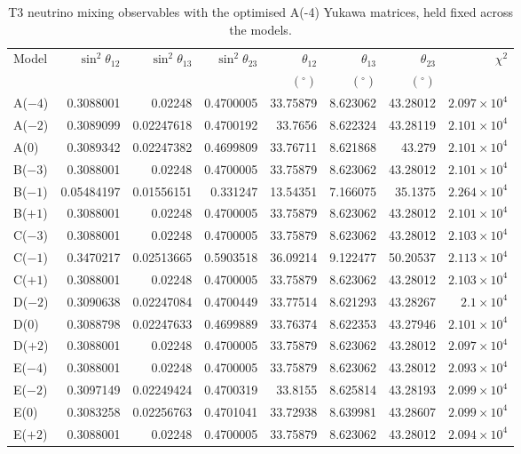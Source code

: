 \begin{table}[p]
\centering
\caption{T3 neutrino mixing observables with the optimised A(-4) Yukawa matrices, held fixed across the models.}
\label{tab:appC_Am4_mixing}
\begingroup
\footnotesize
\setlength{\tabcolsep}{3.2pt}
\begin{tabular}{lrrrrrrr}
\hline
Model & $\sin^2\theta_{12}$ & $\sin^2\theta_{13}$ & $\sin^2\theta_{23}$ & $\theta_{12}$ & $\theta_{13}$ & $\theta_{23}$ & $\chi^2$ \\
 &  &  &  & $(^\circ)$ & $(^\circ)$ & $(^\circ)$ &  \\
\hline
A($-4$) & 0.3088001 & 0.02248 & 0.4700005 & 33.75879 & 8.623062 & 43.28012 & $2.097\times10^{4}$ \\
A($-2$) & 0.3089099 & 0.02247618 & 0.4700192 & 33.7656 & 8.622324 & 43.28119 & $2.101\times10^{4}$ \\
A($0$) & 0.3089342 & 0.02247382 & 0.4699809 & 33.76711 & 8.621868 & 43.279 & $2.101\times10^{4}$ \\
B($-3$) & 0.3088001 & 0.02248 & 0.4700005 & 33.75879 & 8.623062 & 43.28012 & $2.101\times10^{4}$ \\
B($-1$) & 0.05484197 & 0.01556151 & 0.331247 & 13.54351 & 7.166075 & 35.1375 & $2.264\times10^{4}$ \\
B($+1$) & 0.3088001 & 0.02248 & 0.4700005 & 33.75879 & 8.623062 & 43.28012 & $2.101\times10^{4}$ \\
C($-3$) & 0.3088001 & 0.02248 & 0.4700005 & 33.75879 & 8.623062 & 43.28012 & $2.103\times10^{4}$ \\
C($-1$) & 0.3470217 & 0.02513665 & 0.5903518 & 36.09214 & 9.122477 & 50.20537 & $2.113\times10^{4}$ \\
C($+1$) & 0.3088001 & 0.02248 & 0.4700005 & 33.75879 & 8.623062 & 43.28012 & $2.103\times10^{4}$ \\
D($-2$) & 0.3090638 & 0.02247084 & 0.4700449 & 33.77514 & 8.621293 & 43.28267 & $2.1\times10^{4}$ \\
D($0$) & 0.3088798 & 0.02247633 & 0.4699889 & 33.76374 & 8.622353 & 43.27946 & $2.101\times10^{4}$ \\
D($+2$) & 0.3088001 & 0.02248 & 0.4700005 & 33.75879 & 8.623062 & 43.28012 & $2.097\times10^{4}$ \\
E($-4$) & 0.3088001 & 0.02248 & 0.4700005 & 33.75879 & 8.623062 & 43.28012 & $2.093\times10^{4}$ \\
E($-2$) & 0.3097149 & 0.02249424 & 0.4700319 & 33.8155 & 8.625814 & 43.28193 & $2.099\times10^{4}$ \\
E($0$) & 0.3083258 & 0.02256763 & 0.4701041 & 33.72938 & 8.639981 & 43.28607 & $2.099\times10^{4}$ \\
E($+2$) & 0.3088001 & 0.02248 & 0.4700005 & 33.75879 & 8.623062 & 43.28012 & $2.094\times10^{4}$ \\
\hline
\end{tabular}
\endgroup
\end{table}
